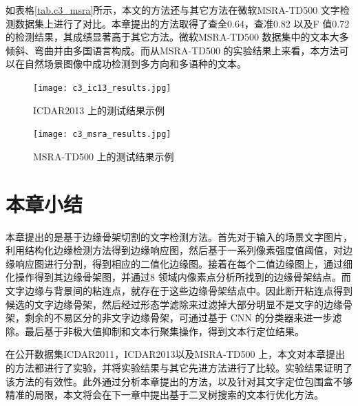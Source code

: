         如表格\ref{tab.c3_msra}所示，本文的方法还与其它方法在微软MSRA-TD500 文字检测数据集上进行了对比。本章提出的方法取得了查全0.64，查准0.82 以及F 值0.72 的检测结果，其成绩显著高于其它方法。微软MSRA-TD500 数据集中的文本大多倾斜、弯曲并由多国语言构成。而从MSRA-TD500 的实验结果上来看，本方法可以在自然场景图像中成功检测到多方向和多语种的文本。

        \begin{figure}[!h]
        \centering
        \texttt{[image: c3\_ic13\_results.jpg]}
        \caption{ICDAR2013 上的测试结果示例}
        \label{fig.c3_ic13_results}
        \end{figure}

        \begin{figure}[!h]
        \centering
        \texttt{[image: c3\_msra\_results.jpg]}
        \caption{MSRA-TD500 上的测试结果示例}
        \label{fig.c3_msra_results}
        \end{figure}

    \section{本章小结}

    本章提出的是基于边缘骨架切割的文字检测方法。首先对于输入的场景文字图片，利用结构化边缘检测方法得到边缘响应图，然后基于一系列像素强度值阈值，对边缘响应图进行分割，得到相应的二值化边缘图。接着在每个二值边缘图上，通过细化操作得到其边缘骨架图，并通过8 领域内像素点分析所找到的边缘骨架结点。而文字边缘与背景间的粘连点，就存在于这些边缘骨架结点中。因此断开粘连点得到候选的文字边缘骨架，然后经过形态学滤除来过滤掉大部分明显不是文字的边缘骨架，剩余的不易区分的非文字边缘骨架，可通过基于 CNN 的分类器来进一步滤除。最后基于非极大值抑制和文本行聚集操作，得到文本行定位结果。

    在公开数据集ICDAR2011，ICDAR2013以及MSRA-TD500 上，本文对本章提出的方法都进行了实验，并将实验结果与其它先进方法进行了比较。实验结果证明了该方法的有效性。此外通过分析本章提出的方法，以及针对其文字定位包围盒不够精准的局限，本文将会在下一章中提出基于二叉树搜索的文本行优化方法。


